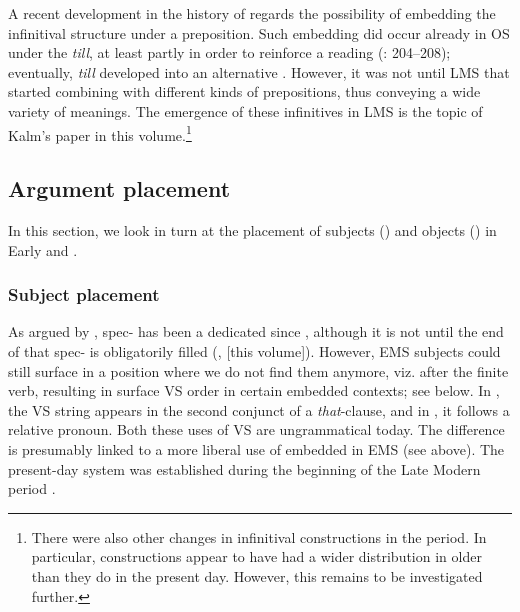 \documentclass[output=paper]{langscibook}
\begin{document}
A recent development in the history of   regards the possibility of embedding the infinitival structure under a preposition. Such embedding did occur already in OS under the  \textit{till}, at least partly in order to reinforce a  reading (\citealt{Kalm2016Satsekvivalenta}: 204–208); eventually, \textit{till} developed into an alternative  \citep[210]{Kalm2016Satsekvivalenta}. However, it was not until LMS that  started combining with different kinds of prepositions, thus conveying a wide variety of  meanings. The emergence of these  infinitives in LMS is the topic of Kalm’s paper in this volume.\footnote{There were also other changes in infinitival constructions in the  period. In particular,  constructions appear to have had a wider distribution in older  than they do in the present day. However, this remains to be investigated further.}


\subsection{ Argument placement}\label{sec:intro:3.2}


In this section, we look in turn at the placement of subjects () and objects () in Early and .


\subsubsection{Subject placement}\label{sec:intro:3.2.1}


As argued by \textcite{Hakansson2008}, spec- has been a dedicated  since , although it is not until the end of  that spec- is obligatorily filled (\citealt{Falk1993}, \citeyear{chapters/02} [this volume]). However, EMS subjects could still surface in a position where we do not find them anymore, viz. after the finite verb, resulting in surface VS order in certain embedded contexts; see  below. In , the VS string appears in the second conjunct of a \textit{that}{}-clause, and in , it follows a relative pronoun. Both these uses of VS are ungrammatical today. The difference is presumably linked to a more liberal use of embedded  in EMS (see  above). The present-day system was established during the beginning of the Late Modern period \citep{Petzell2013}.
\end{document}
